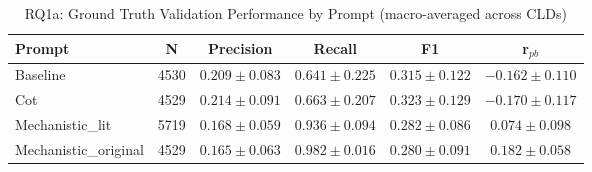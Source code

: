 \begin{table}[htbp]
\centering
\caption{RQ1a: Ground Truth Validation Performance by Prompt (macro-averaged across CLDs)}
\label{tab:rq1a_gt_by_prompt}
\begin{tabular}{lccccc}
\toprule
\textbf{Prompt} & \textbf{N} & \textbf{Precision} & \textbf{Recall} & \textbf{F1} & \textbf{r$_{pb}$} \\
\midrule
Baseline & 4530 & $0.209 \pm 0.083$ & $0.641 \pm 0.225$ & $0.315 \pm 0.122$ & $-0.162 \pm 0.110$ \\
Cot & 4529 & $0.214 \pm 0.091$ & $0.663 \pm 0.207$ & $0.323 \pm 0.129$ & $-0.170 \pm 0.117$ \\
Mechanistic_lit & 5719 & $0.168 \pm 0.059$ & $0.936 \pm 0.094$ & $0.282 \pm 0.086$ & $0.074 \pm 0.098$ \\
Mechanistic_original & 4529 & $0.165 \pm 0.063$ & $0.982 \pm 0.016$ & $0.280 \pm 0.091$ & $0.182 \pm 0.058$ \\
\bottomrule
\end{tabular}
\end{table}
